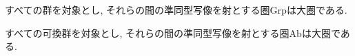 \begin{Prop}
すべての群を対象とし, それらの間の準同型写像を射とする圏$\mathrm{Grp}$は大圏である.
\end{Prop}
\begin{Prop}
すべての可換群を対象とし, それらの間の準同型写像を射とする圏$\mathrm{Ab}$は大圏である.
\end{Prop}
\begin{comment}*************************
\begin{Prop}
すべての位相空間\footnote{定義を本文から外している}を対象とし, それらの間の連続写像\footnote{定義を本文から外している}を射とする圏$\mathrm{Top}$は大圏である.
\end{Prop}
\end{comment}
\begin{comment}*************************
\begin{example}
ある体\footnote{定義を本文から外している}$k$に対して,
すべての$k$次線形空間\footnote{未定義}を対象とし,
それらの間の$k$次線形写像\footnote{未定義}を射とする
圏$\mathrm{Vect}_k$は大圏である.
\end{example}
***************************\end{comment}
\begin{comment}
*************************
\subsection{部分圏}
\begin{Notation}
圏$C$における射$f,g\in\mathrm{Mor}(\mathscr{C})$の合成を$g\circ_{\mathscr{C}}f$で表す.
\end{Notation}
\begin{Def}
圏$\mathscr{A}$が圏$\mathscr{B}$に対して, 以下の条件を満たすとき, {\bf $\mathscr{A}$は$\mathscr{B}$の部分圏である}という.
\begin{enumerate}
\item $\mathrm{Obj}(\mathscr{A})\subset\mathrm{Obj}(\mathscr{B})$
\item $\mathscr{A}$の2つの対象の組の全体が,
$\mathscr{B}$の2つの対象の組の全体の部分集合である.
\item ...
\end{enumerate}
\end{Def}
\begin{Prop}
圏$\mathrm{Ab}$は圏$\mathrm{Grp}$の部分圏である.
\end{Prop}
***************************
\end{comment}
